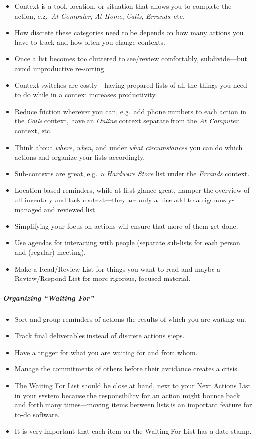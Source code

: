 \documentclass{article}
\begin{document}
\begin{itemize}
  \item Context is a tool, location, or situation that allows you to complete the action, e.g.\ \textit{At Computer}, \textit{At Home}, \textit{Calls}, \textit{Errands}, etc.
  \item How discrete these categories need to be depends on how many actions you have to track and how often you change contexts.
  \item Once a list becomes too cluttered to see/review comfortably, subdivide---but avoid unproductive re-sorting.
  \item Context switches are costly---having prepared lists of all the things you need to do while in a context increases productivity.
  \item Reduce friction wherever you can, e.g.\ add phone numbers to each action in the \textit{Calls} context, have an \textit{Online} context separate from the \textit{At Computer} context, etc.
  \item Think about \emph{where}, \emph{when}, and under \emph{what circumstances} you can do which actions and organize your lists accordingly.
  \item Sub-contexts are great, e.g.\ a \textit{Hardware Store} list under the \textit{Errands} context.
  \item Location-based reminders, while at first glance great, hamper the overview of all inventory and lack context---they are only a nice add to a rigorously-managed and reviewed list.
  \item Simplifying your focus on actions will ensure that more of them get done.
  \item Use agendas for interacting with people (separate sub-lists for each person and (regular) meeting).
  \item Make a Read/Review List for things you want to read and maybe a Review/Respond List for more rigorous, focused material.
\end{itemize}

\subparagraph{Organizing ``Waiting For''}

\begin{itemize}
  \item Sort and group reminders of actions the results of which you are waiting on.
  \item Track final deliverables instead of discrete actions steps.
  \item Have a trigger for what you are waiting for and from whom.
  \item Manage the commitments of others before their avoidance creates a crisis.
  \item The Waiting For List should be close at hand, next to your Next Actions List in your system because the responsibility for an action might bounce back and forth many times---moving items between lists is an important feature for to-do software.
  \item It is very important that each item on the Waiting For List has a date stamp.
\end{itemize}
\end{document}
